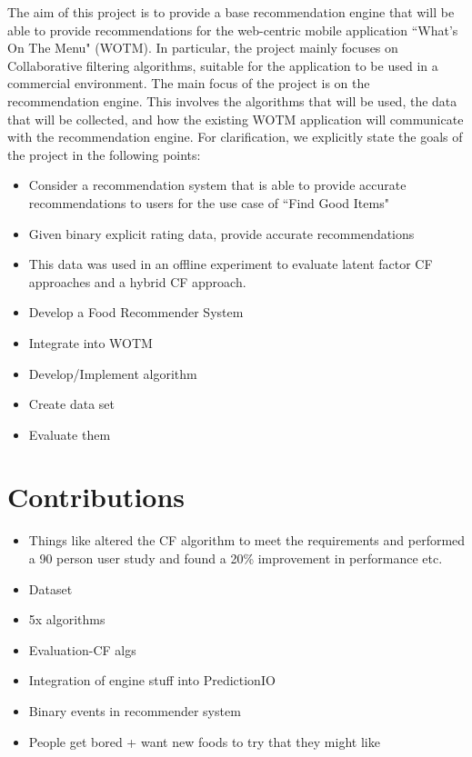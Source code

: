 The aim of this project is to provide a base recommendation engine that will be able to provide recommendations for the web-centric mobile application ``What's On The Menu" (WOTM). In particular, the project mainly focuses on Collaborative filtering algorithms, suitable for the application to be used in a commercial environment. The main focus of the project is on the recommendation engine. This involves the algorithms that will be used, the data that will be collected, and how the existing WOTM application will communicate with the recommendation engine. 
For clarification, we explicitly state the goals of the project in the following points:
\begin{itemize}
	\item{Consider a recommendation system that is able to provide accurate recommendations to users for the use case of ``Find Good Items"}
	\item{Given binary explicit rating data, provide accurate recommendations}
	\item{This data was used in an offline experiment to evaluate latent factor CF approaches and a hybrid CF approach.}
	\item{Develop a Food Recommender System}
	\item{Integrate into WOTM}
	\item{Develop/Implement algorithm}
	\item{Create data set}
	\item{Evaluate them}
\end{itemize}



\section{Contributions}
\begin{itemize}
    \item{Things like altered the CF algorithm to meet the requirements and performed a 90 person user study and found a 20\% improvement in performance etc.}
	\item{Dataset}
	\item{5x algorithms}
	\item{Evaluation-CF algs}
	\item{Integration of engine stuff into PredictionIO}
	\item{Binary events in recommender system}
	\item{People get bored + want new foods to try that they might like}
\end{itemize}
